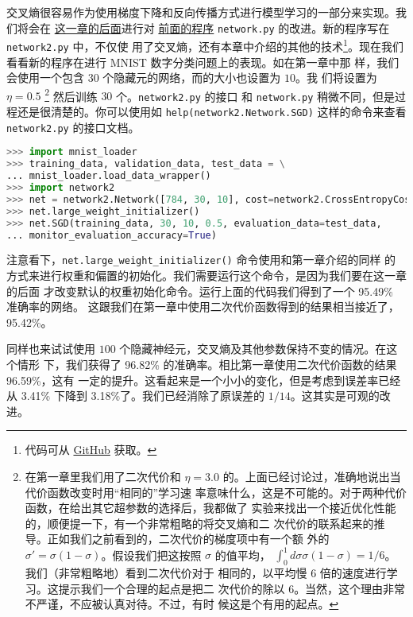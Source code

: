 交叉熵很容易作为使用梯度下降和反向传播方式进行模型学习的一部分来实现。我们将会在%
\hyperref[sec:handwriting_recognition_revisited_the_code]{这一章的后面}进行对
\hyperref[sec:implementing_our_network_to_classify_digits]{前面的程序}
\lstinline!network.py! 的改进。新的程序写在 \lstinline!network2.py!  中，不仅使
用了交叉熵，还有本章中介绍的其他的技术\footnote{代码可从
  \href{https://github.com/mnielsen/neural-networks-and-deep-learning/blob/master/src/network2.py}{GitHub}
  获取。}。现在我们看看新的程序在进行 MNIST 数字分类问题上的表现。如在第一章中那
样，我们会使用一个包含 $30$ 个隐藏元的网络，而\minibatch{}的大小也设置为 $10$。我
们将\learningrate{}设置为 $\eta=0.5$ \footnote{在第一章里我们用了二次代价和 $\eta =
  3.0$ 的\learningrate{}。上面已经讨论过，准确地说出当代价函数改变时用“相同的”学习速
  率意味什么，这是不可能的。对于两种代价函数，在给出其它超参数的选择后，我都做了
  实验来找出一个接近优化性能的\learningrate{}，顺便提一下，有一个非常粗略的将交叉熵和二
  次代价的\learningrate{}联系起来的推导。正如我们之前看到的，二次代价的梯度项中有一个额
  外的 $\sigma' = \sigma(1-\sigma)$。假设我们把这按照 $\sigma$ 的值平均，
  $\int_0^1 d\sigma \sigma(1-\sigma) = 1/6$。我们（非常粗略地）看到二次代价对于
  相同的\learningrate{}，以平均慢 $6$ 倍的速度进行学习。这提示我们一个合理的起点是把二
  次代价的\learningrate{}除以 $6$。当然，这个理由非常不严谨，不应被认真对待。不过，有时
  候这是个有用的起点。} 然后训练 $30$ 个\epochs{}。\lstinline!network2.py! 的接口
和 \lstinline!network.py! 稍微不同，但是过程还是很清楚的。你可以使用如
\lstinline!help(network2.Network.SGD)! 这样的命令来查看 \lstinline!network2.py!
的接口文档。

\begin{lstlisting}[language=Python]
>>> import mnist_loader
>>> training_data, validation_data, test_data = \
... mnist_loader.load_data_wrapper()
>>> import network2
>>> net = network2.Network([784, 30, 10], cost=network2.CrossEntropyCost)
>>> net.large_weight_initializer()
>>> net.SGD(training_data, 30, 10, 0.5, evaluation_data=test_data,
... monitor_evaluation_accuracy=True)
\end{lstlisting}

注意看下，\lstinline!net.large_weight_initializer()! 命令使用和第一章介绍的同样
的方式来进行权重和偏置的初始化。我们需要运行这个命令，是因为我们要在这一章的后面
才改变默认的权重初始化命令。运行上面的代码我们得到了一个 95.49\% 准确率的网络。
这跟我们在第一章中使用二次代价函数得到的结果相当接近了，95.42\%。

同样也来试试使用 $100$ 个隐藏神经元，交叉熵及其他参数保持不变的情况。在这个情形
下，我们获得了 96.82\% 的准确率。相比第一章使用二次代价函数的结果 96.59\%，这有
一定的提升。这看起来是一个小小的变化，但是考虑到误差率已经从 3.41\% 下降到
3.18\%了。我们已经消除了原误差的 $1/14$。这其实是可观的改进。

